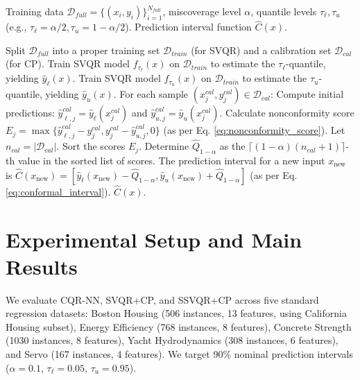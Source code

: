 \documentclass{article}
\begin{document}
\begin{algorithm}[h!]
\caption{Split Conformal SVQR (SVQR+CP)}
\label{alg:svqr_cp}
\begin{algorithmic}[1]
\Require Training data $\mathcal{D}_{full} = \{(x_i, y_i)\}_{i=1}^{N_{full}}$, miscoverage level $\alpha$, quantile levels $\tau_{\ell}, \tau_{u}$ (e.g., $\tau_{\ell} = \alpha/2, \tau_{u} = 1-\alpha/2$).
\Ensure Prediction interval function $\hat{C}(x)$.

\State Split $\mathcal{D}_{full}$ into a proper training set $\mathcal{D}_{train}$ (for SVQR) and a calibration set $\mathcal{D}_{cal}$ (for CP).
\State Train SVQR model $f_{\tau_{\ell}}(x)$ on $\mathcal{D}_{train}$ to estimate the $\tau_{\ell}$-quantile, yielding $\hat{y}_{\ell}(x)$.
\State Train SVQR model $f_{\tau_{u}}(x)$ on $\mathcal{D}_{train}$ to estimate the $\tau_{u}$-quantile, yielding $\hat{y}_{u}(x)$.
\State For each sample $(x_j^{cal}, y_j^{cal}) \in \mathcal{D}_{cal}$:
\State \quad Compute initial predictions: $\hat{y}_{\ell,j}^{cal} = \hat{y}_{\ell}(x_j^{cal})$ and $\hat{y}_{u,j}^{cal} = \hat{y}_{u}(x_j^{cal})$.
\State \quad Calculate nonconformity score $E_j = \max\{ \hat{y}_{\ell,j}^{cal} - y_j^{cal}, y_j^{cal} - \hat{y}_{u,j}^{cal}, 0 \}$ (as per Eq. \ref{eq:nonconformity_score}).
\State Let $n_{cal} = |\mathcal{D}_{cal}|$. Sort the scores ${E_j}$.
\State Determine $\hat{Q}_{1-\alpha}$ as the $\lceil (1-\alpha)(n_{cal}+1) \rceil$-th value in the sorted list of scores.
\State The prediction interval for a new input $x_{\text{new}}$ is $\hat{C}(x_{\text{new}}) = [\hat{y}_{\ell}(x_{\text{new}}) - \hat{Q}_{1-\alpha}, \hat{y}_{u}(x_{\text{new}}) + \hat{Q}_{1-\alpha}]$ (as per Eq. \ref{eq:conformal_interval}).
\State \Return $\hat{C}(x)$.
\end{algorithmic}
\end{algorithm}

\section{Experimental Setup and Main Results}
\label{sec:experiments_main_results}

We evaluate CQR-NN, SVQR+CP, and SSVQR+CP across five standard regression datasets: Boston Housing (506 instances, 13 features, using California Housing subset), Energy Efficiency (768 instances, 8 features), Concrete Strength (1030 instances, 8 features), Yacht Hydrodynamics (308 instances, 6 features), and Servo (167 instances, 4 features). We target 90\% nominal prediction intervals ($\alpha=0.1$, $\tau_{\ell}=0.05$, $\tau_{u}=0.95$).
\end{document}

